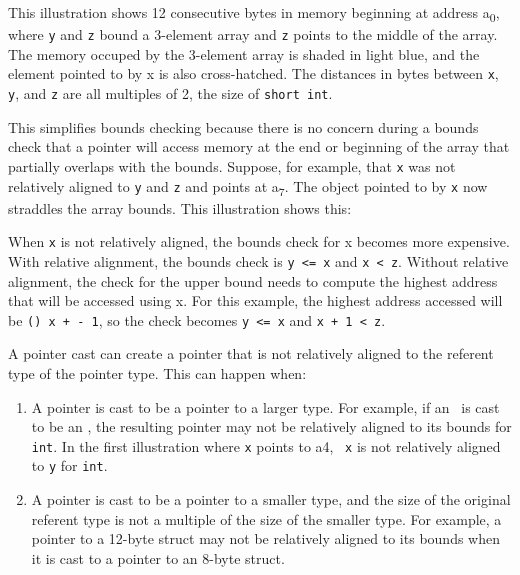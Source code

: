 This illustration shows 12 consecutive bytes in memory beginning at
address a\textsubscript{0}, where \texttt{y} and \texttt{z} bound a
3-element array and \texttt{z} points to the middle of the array. The
memory occuped by the 3-element array is shaded in light blue, and the
element pointed to by x is also cross-hatched. The distances in bytes
between \texttt{x}, \texttt{y}, and \texttt{z} are all multiples of 2,
the size of \texttt{short int}.
\begin{center}
\end{center}

This simplifies bounds checking because there is no concern during a
bounds check that a pointer will access memory at the end or beginning
of the array that partially overlaps with the bounds. Suppose, for
example, that \texttt{x} was not relatively aligned to \texttt{y} and
\texttt{z} and points at a\textsubscript{7}. The object pointed to by
\texttt{x} now straddles the array bounds. This illustration shows this:
\begin{center}
\end{center}

When \texttt{x} is not relatively aligned, the bounds check for x
becomes more expensive. With relative alignment, the bounds check is
\texttt{y <= x} and \texttt{x < z}. Without relative
alignment, the check for the upper bound needs to compute the highest
address that will be accessed using x. For this example, the highest
address accessed will be
\texttt{(\arrayptrchar) x +  - 1}, so the check becomes 
\texttt{y <= x} and \texttt{x + 1 < z}.

A pointer cast can create a pointer that is not relatively aligned to
the referent type of the pointer type. This can happen when:

\begin{enumerate}
\item
  A pointer is cast to be a pointer to a larger type. For example, if an
  \ is cast to be an
  \arrayptrint , the resulting pointer
  may not be relatively aligned to its bounds for \texttt{int}. In the
  first illustration where \texttt{x} points to a4,
  \arrayptrint\ \texttt{x} is not relatively
  aligned to \texttt{y} for \texttt{int}.
\item
  A pointer is cast to be a pointer to a smaller type, and the size of
  the original referent type is not a multiple of the size of the
  smaller type. For example, a pointer to a 12-byte struct may not be
  relatively aligned to its bounds when it is cast to a pointer to an
  8-byte struct.
\end{enumerate}

